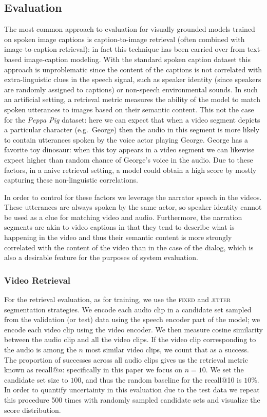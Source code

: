 \subsection{Evaluation}
\label{sec:eval}
The most common approach to evaluation for visually grounded models
trained on spoken image captions is caption-to-image retrieval (often
combined with image-to-caption retrieval): in fact this technique
has been carried over from text-based image-caption modeling.
 With the standard spoken caption dataset this approach is unproblematic since
the content of the captions is not correlated with extra-linguistic
clues in the speech signal, such as speaker identity (since speakers
are randomly assigned to captions) or non-speech environmental
sounds. In such an artificial setting, a retrieval metric measures the ability of the
model to match spoken utterances to images based on their semantic
content. This not the case for the {\it Peppa Pig} dataset: here we
can expect that when a video segment depicts a particular character
(e.g.\ George) then the audio in this segment is more likely to contain
utterances spoken by the voice actor playing George. George has a
favorite toy dinosaur: when this toy appears in a video segment we can
likewise expect higher than random chance of George's voice in the
audio. Due to these factors, in a naive retrieval setting, a model
could obtain a high score by mostly capturing these non-linguistic
correlations.

In order to control for these factors we leverage the
narrator speech in the videos. These utterances are always spoken by
the same actor, so speaker identity cannot be used as a clue for
matching video and audio. Furthermore, the narration segments are akin
to video captions in that they tend to describe what is happening in
the video and thus their semantic content is more strongly
correlated with the content of the video than in the case of the
dialog, which is also a desirable feature for the purposes of system
evaluation.

\subsubsection{Video Retrieval}
\label{sec:retrieval}
For the retrieval evaluation, as for training, we use the
\textsc{fixed} and \textsc{jitter} segmentation strategies. We encode
each audio clip in a candidate set sampled from the validation (or
test) data using the speech encoder part of the model; we encode each
video clip using the video encoder. We then measure cosine similarity
between the audio clip and all the video clips. If the video clip
corresponding to the audio is among the $n$ most similar video clips,
we count that as a success. The proportion of successes across all
audio clips gives us the retrieval metric known as recall@$n$:
specifically in this paper we focus on $n=10$. We set the candidate
set size to $100$, and thus the random baseline for the recall@10 is
$10$\%. In order to quantify uncertainty in this evaluation due to the
test data we repeat this procedure 500 times with randomly sampled
candidate sets and visualize the score distribution.  


